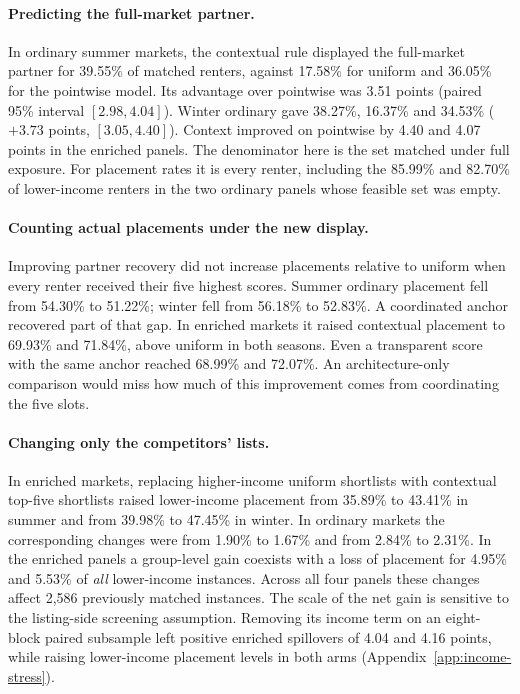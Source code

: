 \paragraph{Predicting the full-market partner.}
In ordinary summer markets, the contextual rule displayed the full-market partner for 39.55\% of matched renters, against 17.58\% for uniform and 36.05\% for the pointwise model. Its advantage over pointwise was 3.51 points (paired 95\% interval $[2.98,4.04]$). Winter ordinary gave 38.27\%, 16.37\% and 34.53\% ($+3.73$ points, $[3.05,4.40]$). Context improved on pointwise by 4.40 and 4.07 points in the enriched panels. The denominator here is the set matched under full exposure. For placement rates it is every renter, including the 85.99\% and 82.70\% of lower-income renters in the two ordinary panels whose feasible set was empty.

\paragraph{Counting actual placements under the new display.}
Improving partner recovery did not increase placements relative to uniform when every renter received their five highest scores. Summer ordinary placement fell from 54.30\% to 51.22\%; winter fell from 56.18\% to 52.83\%. A coordinated anchor recovered part of that gap. In enriched markets it raised contextual placement to 69.93\% and 71.84\%, above uniform in both seasons. Even a transparent score with the same anchor reached 68.99\% and 72.07\%. An architecture-only comparison would miss how much of this improvement comes from coordinating the five slots.

\paragraph{Changing only the competitors' lists.}
In enriched markets, replacing higher-income uniform shortlists with contextual top-five shortlists raised lower-income placement from 35.89\% to 43.41\% in summer and from 39.98\% to 47.45\% in winter. In ordinary markets the corresponding changes were from 1.90\% to 1.67\% and from 2.84\% to 2.31\%. In the enriched panels a group-level gain coexists with a loss of placement for 4.95\% and 5.53\% of \emph{all} lower-income instances. Across all four panels these changes affect 2,586 previously matched instances. The scale of the net gain is sensitive to the listing-side screening assumption. Removing its income term on an eight-block paired subsample left positive enriched spillovers of 4.04 and 4.16 points, while raising lower-income placement levels in both arms (Appendix~\ref{app:income-stress}).
